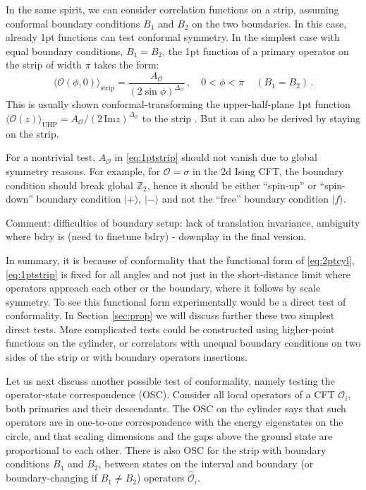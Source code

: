 \documentclass[a4paper,11pt]{article}
\theoremstyle{remark}
\theoremstyle{theorem}
\begin{document}
	 In the same spirit, we can consider correlation functions on a strip, assuming conformal boundary conditions $B_1$ and $B_2$ on the two boundaries. In this case, already 1pt functions can test conformal symmetry. In the simplest case with equal boundary conditions, $B_1=B_2$, the 1pt function of a primary operator on the strip of width $\pi$ takes the form:
	 \begin{equation}
	 \label{eq:1ptstrip}
	 \langle \mathcal{O}(\phi,0)\rangle_{\text{strip}}  = \frac {A_{\mathcal{O}}}
	 {(2 \sin \phi)^{\Delta_\mathcal{O}}}\,, \quad 0<\phi<\pi\,\quad(B_1=B_2)\,.
	 \end{equation}
	 This is usually shown conformal-transforming the upper-half-plane 1pt function $\langle \mathcal{O}(z)\rangle_{\text{UHP}} =  {A_{\mathcal{O}}}/(2\, \text{Im} z)^{\Delta_\mathcal{O}}$ \cite{Cardy:1984bb} to the strip \cite{Calabrese:2006rx}. But it can also be derived by staying on the strip.
	  
	 For a nontrivial test, $A_\mathcal{O}$ in \eqref{eq:1ptstrip} should not vanish due to global symmetry reasons. For example, for $\mathcal{O}=\sigma$ in the 2d Ising CFT, the boundary condition should break global $\mathbb{Z}_2$, hence it should be either ``spin-up'' or ``spin-down'' boundary condition $|+\rangle$, $|-\rangle$ and not the ``free'' boundary condition $|f\rangle$.
	 
	 Comment: difficulties of boundary setup: lack of translation invariance, ambiguity where bdry is (need to finetune bdry) - downplay in the final version.
	 
	 In summary, it is because of conformality that the functional form of \eqref{eq:2ptcyl}, \eqref{eq:1ptstrip} is fixed for all angles and not just in the short-distance limit where operators approach each other or the boundary, where it follows by scale symmetry. To see this functional form experimentally would be a direct test of conformality. In Section \ref{sec:prop} we will discuss further these two simplest direct tests. More complicated tests could be constructed using higher-point functions on the cylinder, or correlators with unequal boundary conditions on two sides of the strip or with boundary operators insertions. 
	
Let us next discuss another possible test of conformality, namely testing the operator-state correspondence (OSC). Consider all local operators of a CFT ${\mathcal{O}}_i$, both primaries and their descendants. The OSC on the cylinder says that such operators are in one-to-one correspondence with the energy eigenstates on the circle, and that scaling dimensions and the gaps above the ground state are proportional to each other. There is also OSC for the strip with boundary conditions $B_1$ and $B_2$, between states on the interval and  boundary (or boundary-changing if $B_1\ne B_2$) operators $\widehat{\mathcal{O}}_i$. 
\end{document}
